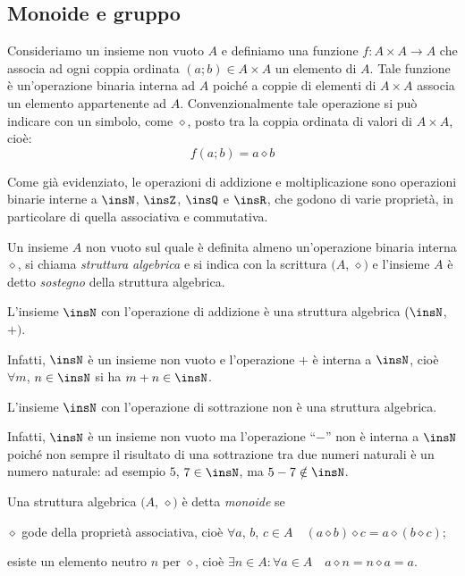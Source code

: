 \subsection{Monoide e gruppo}

Consideriamo un insieme non vuoto $A$ e definiamo una funzione $f:A\times A\rightarrow A$ che associa ad ogni coppia ordinata $(a;b)\in A\times A$ un elemento di $A$. Tale funzione è un'operazione binaria interna ad $A$ poiché a coppie di elementi di $A\times A$ associa un elemento appartenente ad $A$. Convenzionalmente tale operazione si può indicare con un simbolo, come $\diamond$, posto tra la coppia ordinata di valori di $A\times A$, cioè:
\[f(a;b) = a\diamond b\]

Come già evidenziato, le operazioni di addizione e moltiplicazione sono operazioni binarie interne a $\insN$, $\insZ$, $\insQ$ e $\insR$, che godono di varie proprietà, in particolare di quella associativa e commutativa.

\begin{definizione}
Un insieme $A$ non vuoto sul quale è definita almeno un'operazione binaria interna $\diamond$, si chiama \emph{struttura algebrica} e si indica con la scrittura $(A$, $\diamond)$ e l'insieme $A$ è detto \emph{sostegno} della struttura algebrica.
\end{definizione}

\begin{exrig}
 \begin{esempio}
L'insieme $\insN$ con l'operazione di addizione è una struttura algebrica $(\insN$, $+)$.

Infatti, $\insN$ è un insieme non vuoto e l'operazione $+$ è interna a $\insN$, cioè $\forall m$, $n \in \insN$ si ha $m+n \in \insN$.
 \end{esempio}
 
 \begin{esempio}
L'insieme $\insN$ con l'operazione di sottrazione non è una struttura algebrica.

Infatti, $\insN$ è un insieme non vuoto ma l'operazione ``$-$'' non è interna a $\insN$ poiché non sempre il risultato di una sottrazione tra due numeri naturali è un numero naturale: ad esempio $5$, $7\in\insN$, ma $5-7 \notin \insN$.
 \end{esempio}
\end{exrig}

\begin{definizione}
Una struttura algebrica $(A$, $\diamond)$ è detta \emph{monoide} se
\begin{itemize*}
\item $\diamond$ gode della proprietà associativa, cioè $\forall a$, $b$, $c \in A\quad (a \diamond b) \diamond c = a \diamond (b \diamond c)$;
\item esiste un elemento neutro $n$ per $\diamond$, cioè $\exists n \in A : \forall a \in A\quad a\diamond n = n \diamond a = a$.
\end{itemize*}
\end{definizione}

